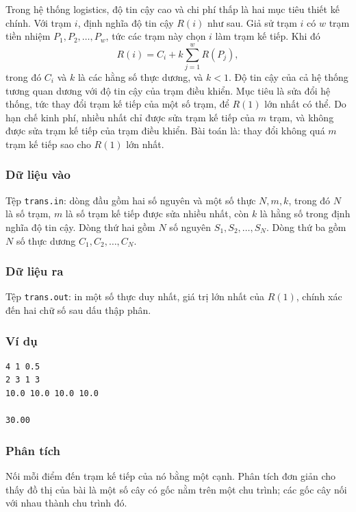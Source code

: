 \documentclass[11pt]{article}
\begin{document}
Trong hệ thống logistics, độ tin cậy cao và chi phí thấp là hai mục tiêu thiết
kế chính. Với trạm $i$, định nghĩa độ tin cậy $R(i)$ như sau. Giả sử trạm
$i$ có $w$ trạm tiền nhiệm $P_1,P_2,\ldots,P_w$, tức các trạm này chọn $i$
làm trạm kế tiếp. Khi đó
\[
  R(i)=C_i+k\sum_{j=1}^{w} R(P_j),
\]
trong đó $C_i$ và $k$ là các hằng số thực dương, và $k<1$. Độ tin cậy của cả
hệ thống tương quan dương với độ tin cậy của trạm điều khiển. Mục tiêu là sửa
đổi hệ thống, tức thay đổi trạm kế tiếp của một số trạm, để $R(1)$ lớn nhất có
thể. Do hạn chế kinh phí, nhiều nhất chỉ được sửa trạm kế tiếp của $m$ trạm,
và không được sửa trạm kế tiếp của trạm điều khiển. Bài toán là: thay đổi
không quá $m$ trạm kế tiếp sao cho $R(1)$ lớn nhất.

\subsubsection*{Dữ liệu vào}

Tệp \texttt{trans.in}: dòng đầu gồm hai số nguyên và một số thực $N,m,k$,
trong đó $N$ là số trạm, $m$ là số trạm kế tiếp được sửa nhiều nhất, còn $k$
là hằng số trong định nghĩa độ tin cậy. Dòng thứ hai gồm $N$ số nguyên
$S_1,S_2,\ldots,S_N$. Dòng thứ ba gồm $N$ số thực dương
$C_1,C_2,\ldots,C_N$.

\subsubsection*{Dữ liệu ra}

Tệp \texttt{trans.out}: in một số thực duy nhất, giá trị lớn nhất của $R(1)$,
chính xác đến hai chữ số sau dấu thập phân.

\subsubsection*{Ví dụ}

\begin{verbatim}
4 1 0.5
2 3 1 3
10.0 10.0 10.0 10.0

30.00
\end{verbatim}

\subsubsection*{Phân tích}

Nối mỗi điểm đến trạm kế tiếp của nó bằng một cạnh. Phân tích đơn giản cho
thấy đồ thị của bài là một số cây có gốc nằm trên một chu trình; các gốc cây
nối với nhau thành chu trình đó.
\end{document}
